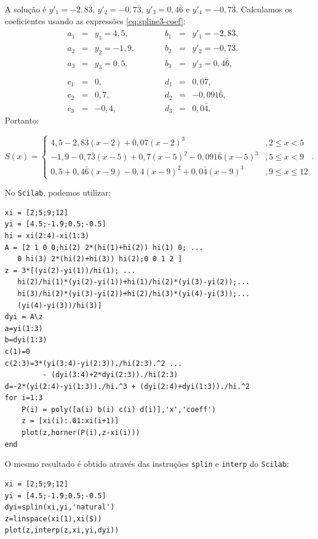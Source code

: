 \begin{sol}
A solução é  $y'_1=-2,8\bar{3}$, $y'_2=-0,7\bar{3}$, $y'_3=0,4\bar{6}$ e $y'_4=-0,7\bar{3}$. Calculamos os coeficientes usando as expressões \eqref{eq:spline3-coef}:
\begin{equation*}
	\begin{array}{lclclcl}
		a_1&=&y_1=4,5,& \qquad&b_1 &=&y'_1=-2,8\bar{3}, \\
		a_2&=&y_2=-1,9,& \qquad&b_2&=&y'_2=-0,7\bar{3}, \\
		a_3&=&y_3=0,5.& \qquad&b_3&=&y'_3=0,4\bar{6}, \\
		&&&&&&\\
		c_1&=&0,& \qquad&d_1&=&0,0\bar{7}, \\
		c_2&=&0,7,& \qquad&d_2&=&-0,091\bar{6}, \\
		c_3&=&-0,4,& \qquad&d_3&=&0,0\bar{4}.
	\end{array}
\end{equation*}
Portanto:
\begin{small}
	\begin{equation*}
		S(x)=\left\{\begin{array}{ll}
			4,5-2,8\bar{3}(x-2)+0,0\bar{7}(x-2)^3 &\!, 2\leq x<5\\
			-1,9-0,7\bar{3}(x-5)+0,7(x-5)^2-0,091\bar{6}(x-5)^3 &\!, 5\leq x<9\\
			0,5+0,4\bar{6}(x-9)-0,4(x-9)^2+0,0\bar{4}(x-9)^3 &\!, 9\leq x\leq 12
		\end{array}\right. .
	\end{equation*}
\end{small}

\ifisscilab
No \verb+Scilab+, podemos utilizar:
\begin{verbatim}
xi = [2;5;9;12]
yi = [4.5;-1.9;0.5;-0.5]
hi = xi(2:4)-xi(1:3)
A = [2 1 0 0;hi(2) 2*(hi(1)+hi(2)) hi(1) 0; ...
   0 hi(3) 2*(hi(2)+hi(3)) hi(2);0 0 1 2 ]
z = 3*[(yi(2)-yi(1))/hi(1); ...
   hi(2)/hi(1)*(yi(2)-yi(1))+hi(1)/hi(2)*(yi(3)-yi(2));...
   hi(3)/hi(2)*(yi(3)-yi(2))+hi(2)/hi(3)*(yi(4)-yi(3));...
   (yi(4)-yi(3))/hi(3)]
dyi = A\z
a=yi(1:3)
b=dyi(1:3)
c(1)=0
c(2:3)=3*(yi(3:4)-yi(2:3))./hi(2:3).^2 ...
         - (dyi(3:4)+2*dyi(2:3))./hi(2:3)
d=-2*(yi(2:4)-yi(1:3))./hi.^3 + (dyi(2:4)+dyi(1:3))./hi.^2
for i=1:3
    P(i) = poly([a(i) b(i) c(i) d(i)],'x','coeff')
    z = [xi(i):.01:xi(i+1)]
    plot(z,horner(P(i),z-xi(i)))
end
\end{verbatim}

O mesmo resultado é obtido através das instruções \verb+splin+ e \verb+interp+ do \verb+Scilab+:
\begin{verbatim}
xi = [2;5;9;12]
yi = [4.5;-1.9;0.5;-0.5]
dyi=splin(xi,yi,'natural')
z=linspace(xi(1),xi($))
plot(z,interp(z,xi,yi,dyi))
\end{verbatim}
\fi
\end{sol}

